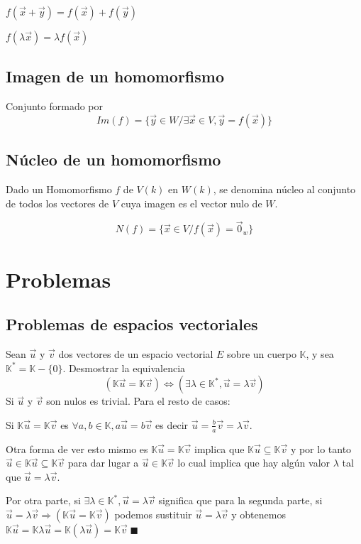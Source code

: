 $f(\vec{x}+\vec{y})=f(\vec{x})+f(\vec{y})$

$f(\lambda\vec{x}) = \lambda f(\vec{x})$

\section{Imagen de un homomorfismo}
Conjunto formado por 
$$Im(f)=\{\vec{y}\in W/\exists \vec{x}\in V, \vec{y}=f(\vec{x})\}$$

\section{Núcleo de un homomorfismo}
Dado un Homomorfismo $f$ de $V(k)$ en $W(k)$, se denomina núcleo al conjunto de 
todos los vectores de $V$ cuya imagen es el vector nulo de $W$.

$$N(f)=\{\vec{x}\in V/f(\vec{x})=\vec{0}_w\}$$

\chapter{Problemas}

\section{Problemas de espacios vectoriales}

\begin{problema}{\cite[90p140]{prieto2000}}{
	Sean $\vec{u}$ y $\vec{v}$ dos vectores de un espacio vectorial $E$ sobre un cuerpo
	$\mathbb{K}$, y sea $\mathbb{K}^*=\mathbb{K}-\{0\}$. Desmostrar la equivalencia
	$$(\mathbb{K}\vec{u}=\mathbb{K}\vec{v}) \iff
	(\exists\lambda\in\mathbb{K}^*,\vec{u}=\lambda\vec{v})$$
	}
	Si $\vec{u}$ y $\vec{v}$ son nulos es trivial. Para el resto de casos:

	Si $\mathbb{K}\vec{u}=\mathbb{K}\vec{v}$ es $\forall a,b \in \mathbb{K}, a\vec{u}=b\vec{v}$ es
	decir $\vec{u}=\frac{b}{a}\vec{v}=\lambda\vec{v}$.

	Otra forma de ver esto mismo es $\mathbb{K}\vec{u}=\mathbb{K}\vec{v}$ implica que $\mathbb{K}\vec{u}\subseteq
	\mathbb{K}\vec{v}$ y por lo tanto $\vec{u}\in\mathbb{K}\vec{u}\subseteq\mathbb{K}\vec{v}$ para
	dar lugar a $\vec{u}\in\mathbb{K}\vec{v}$ lo cual implica que hay algún valor $\lambda$ tal que
	$\vec{u}=\lambda\vec{v}$.

	Por otra parte, si $\exists\lambda\in\mathbb{K}^*, \vec{u}=\lambda\vec{v}$ significa que 
	para la segunda parte, si
	$\vec{u}=\lambda\vec{v}\Rightarrow(\mathbb{K}\vec{u}=\mathbb{K}\vec{v})$ 
	podemos sustituir $\vec{u}=\lambda\vec{v}$ y obtenemos
	$\mathbb{K}\vec{u}=\mathbb{K}\lambda\vec{u}=\mathbb{K}(\lambda\vec{u})=\mathbb{K}\vec{v}\;\blacksquare$
\end{problema}

